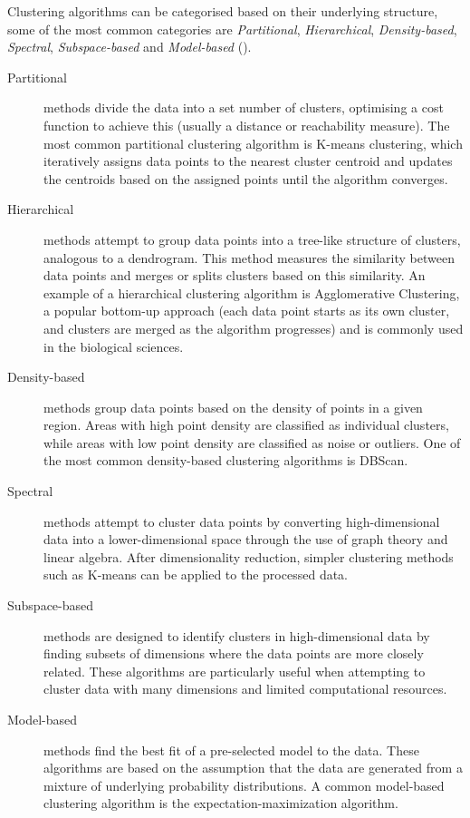 Clustering algorithms can be categorised based on their underlying structure, some of the most common categories are \emph{Partitional}, \emph{Hierarchical}, \emph{Density-based}, \emph{Spectral}, \emph{Subspace-based} and \emph{Model-based} (\cite{rodriguezClusteringAlgorithmsComparative2019}).

\begin{description}

    \item[Partitional] methods divide the data into a set number of clusters, optimising a cost function to achieve this (usually a distance or reachability measure). The most common partitional clustering algorithm is K-means clustering, which iteratively assigns data points to the nearest cluster centroid and updates the centroids based on the assigned points until the algorithm converges. 

    \item[Hierarchical] methods attempt to group data points into a tree-like structure of clusters, analogous to a dendrogram. This method measures the similarity between data points and merges or splits clusters based on this similarity. An example of a hierarchical clustering algorithm is Agglomerative Clustering, a popular bottom-up approach (each data point starts as its own cluster, and clusters are merged as the algorithm progresses) and is commonly used in the biological sciences.

    \item[Density-based] methods group data points based on the density of points in a given region. Areas with high point density are classified as individual clusters, while areas with low point density are classified as noise or outliers. One of the most common density-based clustering algorithms is \ac{DBScan}.

    \item[Spectral] methods attempt to cluster data points by converting high-dimensional data into a lower-dimensional space through the use of graph theory and linear algebra. After dimensionality reduction, simpler clustering methods such as K-means can be applied to the processed data.

    \item[Subspace-based] methods are designed to identify clusters in high-dimensional data by finding subsets of dimensions where the data points are more closely related. These algorithms are particularly useful when attempting to cluster data with many dimensions and limited computational resources.

    \item[Model-based] methods find the best fit of a pre-selected model to the data. These algorithms are based on the assumption that the data are generated from a mixture of underlying probability distributions. A common model-based clustering algorithm is the expectation-maximization algorithm.
    
\end{description}

